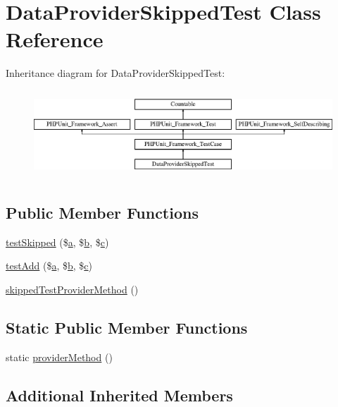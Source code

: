 \hypertarget{class_data_provider_skipped_test}{}\section{Data\+Provider\+Skipped\+Test Class Reference}
\label{class_data_provider_skipped_test}
Inheritance diagram for Data\+Provider\+Skipped\+Test\+:\begin{figure}[H]
\begin{center}
\leavevmode
\includegraphics[height=3.303835cm]{class_data_provider_skipped_test}
\end{center}
\end{figure}
\subsection*{Public Member Functions}
\begin{DoxyCompactItemize}
\item 
\mbox{\hyperlink{class_data_provider_skipped_test_ad8fb7c4415043bb42ff9d93e37137d52}{test\+Skipped}} (\$\mbox{\hyperlink{interfacea}{a}}, \$\mbox{\hyperlink{interfaceb}{b}}, \$\mbox{\hyperlink{classc}{c}})
\item 
\mbox{\hyperlink{class_data_provider_skipped_test_aee936425adb92ab632ef751353789f64}{test\+Add}} (\$\mbox{\hyperlink{interfacea}{a}}, \$\mbox{\hyperlink{interfaceb}{b}}, \$\mbox{\hyperlink{classc}{c}})
\item 
\mbox{\hyperlink{class_data_provider_skipped_test_a74b695072ad6190bc42de7e81bde38d9}{skipped\+Test\+Provider\+Method}} ()
\end{DoxyCompactItemize}
\subsection*{Static Public Member Functions}
\begin{DoxyCompactItemize}
\item 
static \mbox{\hyperlink{class_data_provider_skipped_test_aa41ff734aa7d002dc2a7a32a9e35b499}{provider\+Method}} ()
\end{DoxyCompactItemize}
\subsection*{Additional Inherited Members}


